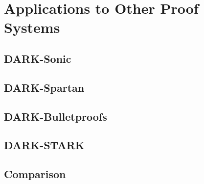 \documentclass{article}
\begin{document}
\section{Applications to Other Proof Systems}

\subsection{DARK-Sonic}

\subsection{DARK-Spartan}

\subsection{DARK-Bulletproofs}

\subsection{DARK-STARK}

\subsection{Comparison}
\end{document}
